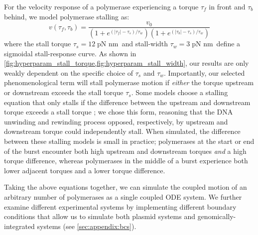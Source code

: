 \documentclass[11pt]{article} %
\newcommand{\unit}[1]{\; \text{#1}\,}
\begin{document}
For the velocity response of a polymerase experiencing a torque \(\tau_f\) in front and \(\tau_b\) behind, we model polymerase stalling as:
\begin{equation}
    v(\tau_f, \tau_b) = \frac{v_0}{(1 + e^{(|\tau_f| - \tau_s)/\tau_w})(1 + e^{(|\tau_b| - \tau_s)/\tau_w})}
\label{eq:velocity_response}
\end{equation}
where the stall torque \(\tau_s = 12 \unit{pN nm}\) and stall-width \(\tau_w = 3 \unit{pN nm}\) define a sigmoidal stall-response curve.
As shown in \cref{fig:hyperparam_stall_torque,fig:hyperparam_stall_width}, our results are only weakly dependent on the specific choice of \(\tau_s\) and \(\tau_w\).
Importantly, our selected phenomenological term will stall polymerase motion if \emph{either} the torque upstream or downstream exceeds the stall torque \(\tau_s\). Some models choose a stalling equation that only stalls if the difference between the upstream and downstream torque exceeds a stall torque \parencite{tripathiDNASupercoilingmediatedCollective2021}; we chose this form, reasoning that the DNA unwinding and rewinding process opposed, respectively, by upstream and downstream torque could independently stall. When simulated, the difference between these stalling models is small in practice; polymerases at the start or end of the burst encounter both high upstream and downstream torques \emph{and} a high torque difference, whereas polymerases in the middle of a burst experience both lower adjacent torques and a lower torque difference.

Taking the above equations together, we can simulate the coupled motion of an arbitrary number of polymerases as a single coupled ODE system. We further examine different experimental systems by implementing different boundary conditions that allow us to simulate both plasmid systems and genomically-integrated systems (see \cref{sec:appendix:bcs}).

\end{document}
